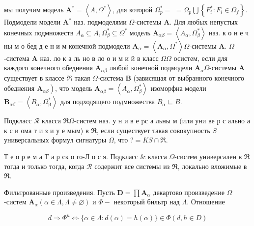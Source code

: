 \documentclass[10pt]{article}
\begin{document}
мы получим модель $\boldsymbol{A}^{*}=\left\langle A, \Omega^{*}\right\rangle$, для которой $\Omega_{p}^{*}=$ $=\Omega_{p} \bigcup\left\{F_{i}^{*}: F_{i} \in \Omega_{f}\right\}$. Подмодели модели $\boldsymbol{A}^{*}$ наз. подмоделями $\Omega$-системы $\boldsymbol{A}$. Для любых непустых конечных подмножеств $A_{\alpha} \subseteq A, \Omega_{\beta}^{*} \subseteq \Omega^{*}$ модель $\boldsymbol{A}_{\alpha \beta}=\left\langle A_{\alpha}, \Omega_{\beta}^{*}\right\rangle$ наз. к о н е ч ны м о бед д е н и м конечной подмодели $\boldsymbol{A}_{\alpha}=\left\langle\boldsymbol{A}_{\alpha}, \Omega^{*}\right\rangle \Omega$-системы $\boldsymbol{A}$. $\Omega$-система $\boldsymbol{A}$ наз. ло к а ль но в ло о и м и й в класс $\Omega \Omega$ осистем, если для каждого конечного обеднения $\boldsymbol{A}_{\alpha \beta}$ любой конечной подмодели $\boldsymbol{A}_{\alpha} \Omega$-системы $\boldsymbol{A}$ существует в классе $\mathscr{\Re}$ такая $\Omega$-система $\boldsymbol{B}$ (зависящая от выбранного конечного обеднения $\left.\boldsymbol{A}_{\alpha \beta}\right)$, что модель $\boldsymbol{A}_{\alpha \beta}=\left\langle A_{\alpha}, \Omega_{\beta}^{*}\right\rangle$ изоморфна модели $\boldsymbol{B}_{\alpha \beta}=\left\langle B_{\alpha}, \Omega_{\boldsymbol{\beta}}^{*}\right\rangle$ для подходящего подмножества $B_{\alpha} \sqsubseteq B$.



Подкласс $\mathscr{R}$ класса $\Re \Omega$-систем наз. у н и в е pс а льны м (или уни ве р с ально а к с и ома т и з и у е мым) в $\Re$, если существует такая совокупность $S$ универсальных формул сигнатуры $\Omega$, что $?=K S \cap \Re$.



Т е о р е м а Т а р ск о го-Л о с я. Подкласс $\&$ класса $\Omega$-систем универсален в $\Re$ тогда и только тогда, когда $\mathscr{R}$ содержит все системы из $\Re$, локально вложимые в $\mathfrak{R}$.



Фильтрованные произведения. Пусть $\boldsymbol{D}=\prod \boldsymbol{A}_{\alpha}$ декартово произведение $\Omega$-систем $\boldsymbol{A}_{\alpha}(\alpha \in \Lambda, \Lambda \neq \varnothing)$ и $\Phi-$ некоторый бильтр над $\Lambda$. Отношение



\[

d \Longrightarrow \Phi^{h} \Longleftrightarrow\{\alpha \in \Lambda: d(\alpha)=h(\alpha)\} \in \Phi(d, h \in D)

\]
\end{document}
